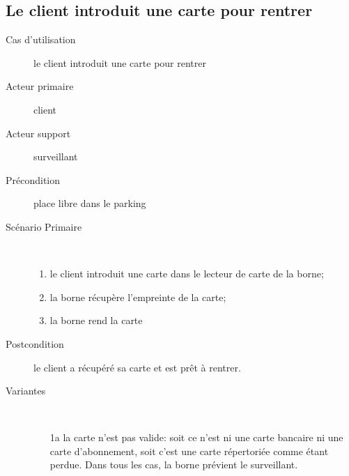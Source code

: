\documentclass[a4paper]{article}
\begin{document}
\subsection{Le client introduit une carte pour rentrer}
\begin{description}
	\item[Cas d'utilisation] le client introduit une carte pour rentrer
	\item[Acteur primaire] client
	\item[Acteur support] surveillant
	\item[Pr\'econdition] place libre dans le parking
	\item[Sc\'enario Primaire] \
	\begin{enumerate}
		\item le client introduit une carte dans le lecteur de carte de la borne;
		\item la borne r\'ecup\`ere l'empreinte de la carte;
		\item la borne rend la carte
	\end{enumerate}
	\item[Postcondition] le client a r\'ecup\'er\'e sa carte et est pr\^et \`a rentrer.
	\item[Variantes] \
	\begin{enumerate}
		\item[1a] la carte n'est pas valide: soit ce n'est ni une carte bancaire
			ni une carte d'abonnement, soit c'est une carte r\'epertori\'ee
			comme \'etant perdue. Dans tous les cas, la borne pr\'evient le
			surveillant.
	\end{enumerate}
\end{description}
\end{document}
